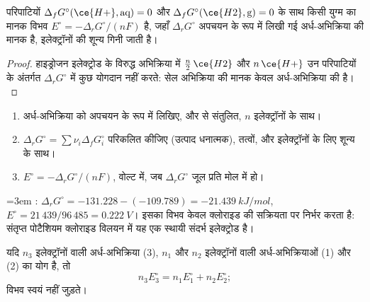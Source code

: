 \begin{proposition}[गिब्स ऊर्जाओं से मानक विभव]\label{prop:b2:cell-thermodynamics:standard-potential}
परिपाटियों $\Delta_f G^\circ(\ce{H+}, \text{aq}) = 0$ और
$\Delta_f G^\circ(\ce{H2}, \text{g}) = 0$ के साथ किसी युग्म का मानक विभव
$E^\circ = -\Delta_r G^\circ/(nF)$ है, जहाँ $\Delta_r G^\circ$ अपचयन के रूप में लिखी गई
अर्ध-अभिक्रिया की मानक  है, इलेक्ट्रॉनों की  शून्य
गिनी जाती है।
\end{proposition}

\begin{proof}
हाइड्रोजन इलेक्ट्रोड के विरुद्ध अभिक्रिया में $\tfrac n2\,\ce{H2}$ और
$n\,\ce{H+}$ उन परिपाटियों के अंतर्गत $\Delta_r G^\circ$ में कुछ योगदान नहीं करते:
सेल अभिक्रिया की मानक  केवल अर्ध-अभिक्रिया की है।
\end{proof}

\begin{method}[सारणियों से मानक विभव]\label{met:b2:cell-thermodynamics:e-from-gibbs}
\begin{enumerate}
  \item अर्ध-अभिक्रिया को अपचयन के रूप में लिखिए,  और
         से संतुलित, $n$ इलेक्ट्रॉनों के साथ।
  \item $\Delta_r G^\circ = \sum\nu_i\Delta_f G^\circ_i$ परिकलित कीजिए (उत्पाद
        धनात्मक), तत्वों,  और इलेक्ट्रॉनों के लिए शून्य के साथ।
  \item $E^\circ = -\Delta_r G^\circ/(nF)$, वोल्ट में, जब $\Delta_r G^\circ$
        जूल प्रति मोल में हो।
\end{enumerate}
\end{method}

\begin{example}[सिल्वर क्लोराइड इलेक्ट्रोड]\label{ex:b2:cell-thermodynamics:agcl}\emergencystretch=3em
: $\Delta_r G^\circ = -131.228 - (-109.789) =
\qty{-21.439}{kJ/mol}$, $E^\circ = 21\,439/96\,485 = \qty{0.222}{V}$। इसका विभव
केवल क्लोराइड की सक्रियता पर निर्भर करता है: संतृप्त पोटैशियम क्लोराइड
विलयन में यह एक स्थायी संदर्भ इलेक्ट्रोड है।
\end{example}

\begin{proposition}[विभवों का संयोजन]\label{prop:b2:cell-thermodynamics:combining}
यदि $n_3$ इलेक्ट्रॉनों वाली अर्ध-अभिक्रिया (3), $n_1$ और $n_2$ इलेक्ट्रॉनों वाली
अर्ध-अभिक्रियाओं (1) और (2) का योग है, तो
\[
  n_3E_3^\circ = n_1E_1^\circ + n_2E_2^\circ ;
\]
विभव स्वयं नहीं जुड़ते।
\end{proposition}


